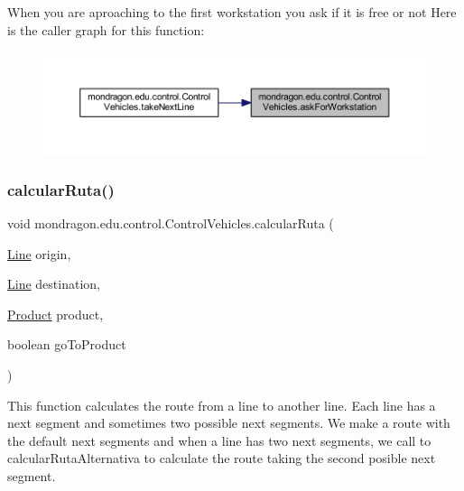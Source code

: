 When you are aproaching to the first workstation you ask if it is free or not Here is the caller graph for this function\+:\nopagebreak
\begin{figure}[H]
\begin{center}
\leavevmode
\includegraphics[width=350pt]{classmondragon_1_1edu_1_1control_1_1_control_vehicles_a63aa6c69adc18b9af382fdcc7ae088ec_icgraph}
\end{center}
\end{figure}
\mbox{\label{classmondragon_1_1edu_1_1control_1_1_control_vehicles_a12c621e7167cf4747f97a1689ab39ef1}} 
\subsubsection{\texorpdfstring{calcularRuta()}{calcularRuta()}}
{\footnotesize\ttfamily void mondragon.\+edu.\+control.\+Control\+Vehicles.\+calcular\+Ruta (\begin{DoxyParamCaption}\item[{\mbox{\hyperlink{classmondragon_1_1edu_1_1clases_1_1_line}{Line}}}]{origin,  }\item[{\mbox{\hyperlink{classmondragon_1_1edu_1_1clases_1_1_line}{Line}}}]{destination,  }\item[{\mbox{\hyperlink{classmondragon_1_1edu_1_1clases_1_1_product}{Product}}}]{product,  }\item[{boolean}]{go\+To\+Product }\end{DoxyParamCaption})\hspace{0.3cm}{\ttfamily [inline]}}

This function calculates the route from a line to another line. Each line has a next segment and sometimes two possible next segments. We make a route with the default next segments and when a line has two next segments, we call to calcular\+Ruta\+Alternativa to calculate the route taking the second posible next segment.



